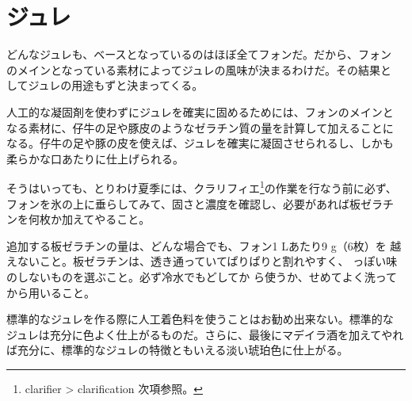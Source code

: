 \hypertarget{gelees-diverses}{%
\section{ジュレ}\label{gelees-diverses}}


 

どんなジュレも、ベースとなっているのはほぼ全てフォンだ。だから、フォン
のメインとなっている素材によってジュレの風味が決まるわけだ。その結果と
してジュレの用途もずと決まってくる。

人工的な凝固剤を使わずにジュレを確実に固めるためには、フォンのメインと
なる素材に、仔牛の足や豚皮のようなゼラチン質の量を計算して加えることに
なる。仔牛の足や豚の皮を使えば、ジュレを確実に凝固させられるし、しかも
柔らかな口あたりに仕上げられる。

そうはいっても、とりわけ夏季には、クラリフィエ\footnote{clarifier
  \textgreater{} clarification 次項参照。}の作業を行なう前に必ず、
フォンを氷の上に垂らしてみて、固さと濃度を確認し、必要があれば板ゼラチ
ンを何枚か加えてやること。

追加する板ゼラチンの量は、どんな場合でも、フォン1 Lあたり9 g（6枚）を
越えないこと。板ゼラチンは、透き通っていてぱりぱりと割れやすく、
っぽい味のしないものを選ぶこと。必ず冷水でもどしてか
ら使うか、せめてよく洗ってから用いること。

標準的なジュレを作る際に人工着色料を使うことはお勧め出来ない。標準的な
ジュレは充分に色よく仕上がるものだ。さらに、最後にマデイラ酒を加えてやれ
ば充分に、標準的なジュレの特徴ともいえる淡い琥珀色に仕上がる。

